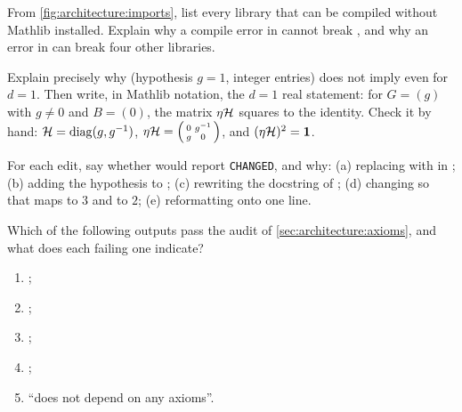 \begin{exercise}[$\star$]
From \cref{fig:architecture:imports}, list every library that can be compiled without
Mathlib installed. Explain why a compile error in  cannot break
, and why an error in  can break four
other libraries.
\end{exercise}

\begin{exercise}[$\star\star$]
Explain precisely why  (hypothesis $g=1$, integer entries) does
not imply  even for $d=1$. Then write, in Mathlib notation, the
$d=1$ real statement: for $G=(g)$ with $g\neq0$ and $B=(0)$, the matrix $\eta\mathcal{H}$ squares to
the identity. Check it by hand: $\mathcal{H}=\operatorname{diag}(g,g^{-1})$, $\eta\mathcal{H}=\begin{psmallmatrix}0&g^{-1}\\
g&0\end{psmallmatrix}$, and $(\eta\mathcal{H})^2=\mathbf 1$.
\end{exercise}

\begin{exercise}[$\star\star$]
For each edit, say whether  would report \texttt{CHANGED},
and why: (a) replacing  with  in ;
(b) adding the hypothesis  to ; (c) rewriting the
docstring of ; (d) changing  so that  maps to $3$
and  to $2$; (e) reformatting  onto one line.
\end{exercise}

\begin{exercise}[$\star\star$]
Which of the following  outputs pass the audit of
\cref{sec:architecture:axioms}, and what does each failing one indicate?
\begin{enumerate}[label=(\alph*),leftmargin=*,itemsep=0pt]
\item \lean{[propext]};
\item {};
\item {};
\item {};
\item ``does not depend on any axioms''.
\end{enumerate}
\end{exercise}

